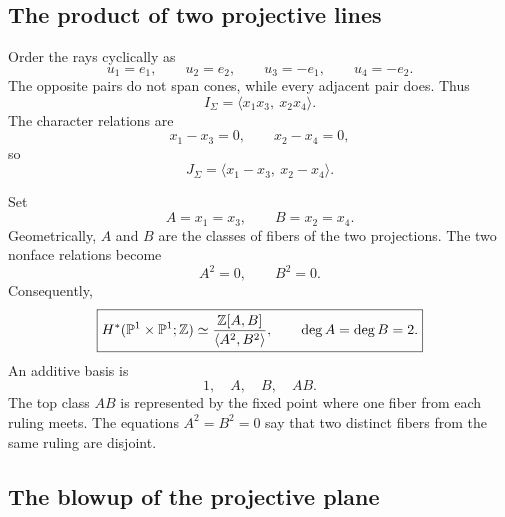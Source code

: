 \subsection{The product of two projective lines}

\begin{example}
\label{ex:cohomology-ring-product-lines}
Order the rays cyclically as
\[
u_1=e_1,
\qquad
u_2=e_2,
\qquad
u_3=-e_1,
\qquad
u_4=-e_2.
\]
The opposite pairs do not span cones, while every adjacent pair does.
Thus
\[
I_\Sigma
=
\langle x_1x_3,\ x_2x_4\rangle.
\]
The character relations are
\[
x_1-x_3=0,
\qquad
x_2-x_4=0,
\]
so
\[
J_\Sigma
=
\langle x_1-x_3,\ x_2-x_4\rangle.
\]

Set
\[
A=x_1=x_3,
\qquad
B=x_2=x_4.
\]
Geometrically, \(A\) and \(B\) are the classes of fibers of the two
projections. The two nonface relations become
\[
A^2=0,
\qquad
B^2=0.
\]
Consequently,
\[
\boxed{
H^*(\mathbb{P}^1\times\mathbb{P}^1;\mathbb{Z})
\simeq
\frac{\mathbb{Z}[A,B]}{\langle A^2,B^2\rangle},
\qquad
\deg A=\deg B=2.
}
\]
An additive basis is
\[
1,\quad A,\quad B,\quad AB.
\]
The top class \(AB\) is represented by the fixed point where one
fiber from each ruling meets. The equations \(A^2=B^2=0\) say that two
distinct fibers from the same ruling are disjoint.
\end{example}

\subsection{The blowup of the projective plane}

